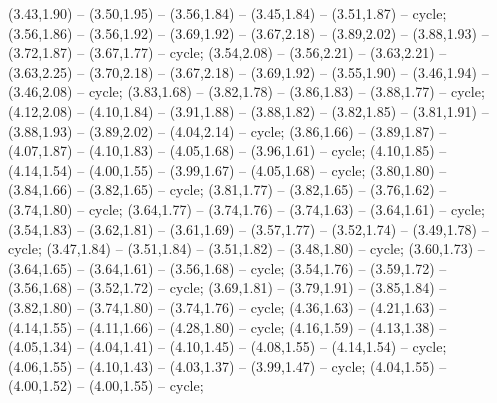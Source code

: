 { (3.43,1.90) -- (3.50,1.95) -- (3.56,1.84) -- (3.45,1.84) -- (3.51,1.87) -- cycle;
 (3.56,1.86) -- (3.56,1.92) -- (3.69,1.92) -- (3.67,2.18) -- (3.89,2.02) -- (3.88,1.93) -- (3.72,1.87) -- (3.67,1.77) -- cycle;
 (3.54,2.08) -- (3.56,2.21) -- (3.63,2.21) -- (3.63,2.25) -- (3.70,2.18) -- (3.67,2.18) -- (3.69,1.92) -- (3.55,1.90) -- (3.46,1.94) -- (3.46,2.08) -- cycle;
 (3.83,1.68) -- (3.82,1.78) -- (3.86,1.83) -- (3.88,1.77) -- cycle;
 (4.12,2.08) -- (4.10,1.84) -- (3.91,1.88) -- (3.88,1.82) -- (3.82,1.85) -- (3.81,1.91) -- (3.88,1.93) -- (3.89,2.02) -- (4.04,2.14) -- cycle;
 (3.86,1.66) -- (3.89,1.87) -- (4.07,1.87) -- (4.10,1.83) -- (4.05,1.68) -- (3.96,1.61) -- cycle;
 (4.10,1.85) -- (4.14,1.54) -- (4.00,1.55) -- (3.99,1.67) -- (4.05,1.68) -- cycle;
 (3.80,1.80) -- (3.84,1.66) -- (3.82,1.65) -- cycle;
 (3.81,1.77) -- (3.82,1.65) -- (3.76,1.62) -- (3.74,1.80) -- cycle;
 (3.64,1.77) -- (3.74,1.76) -- (3.74,1.63) -- (3.64,1.61) -- cycle;
 (3.54,1.83) -- (3.62,1.81) -- (3.61,1.69) -- (3.57,1.77) -- (3.52,1.74) -- (3.49,1.78) -- cycle;
 (3.47,1.84) -- (3.51,1.84) -- (3.51,1.82) -- (3.48,1.80) -- cycle;
 (3.60,1.73) -- (3.64,1.65) -- (3.64,1.61) -- (3.56,1.68) -- cycle;
 (3.54,1.76) -- (3.59,1.72) -- (3.56,1.68) -- (3.52,1.72) -- cycle;
 (3.69,1.81) -- (3.79,1.91) -- (3.85,1.84) -- (3.82,1.80) -- (3.74,1.80) -- (3.74,1.76) -- cycle;
 (4.36,1.63) -- (4.21,1.63) -- (4.14,1.55) -- (4.11,1.66) -- (4.28,1.80) -- cycle;
 (4.16,1.59) -- (4.13,1.38) -- (4.05,1.34) -- (4.04,1.41) -- (4.10,1.45) -- (4.08,1.55) -- (4.14,1.54) -- cycle;
 (4.06,1.55) -- (4.10,1.43) -- (4.03,1.37) -- (3.99,1.47) -- cycle;
 (4.04,1.55) -- (4.00,1.52) -- (4.00,1.55) -- cycle;
}

